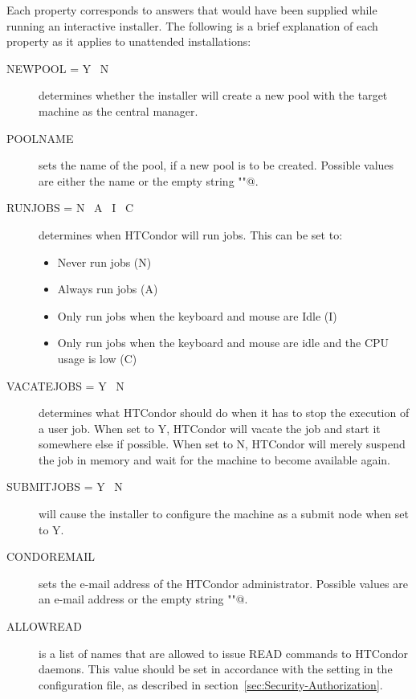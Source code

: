 Each property corresponds to answers that would have been
supplied while running an interactive installer.
The following is a brief explanation of each property
as it applies to unattended installations:

\begin{description}
\item [NEWPOOL = \lt{} Y \Bar{}\ N \gt{}]
determines whether the installer will create a new pool with the target
machine as the central manager.

\item [POOLNAME]
sets the name of the pool, if a new pool is to be created. Possible values
are either the name or the empty string \verb@""@.

\item [RUNJOBS = \lt{} N \Bar{}\ A \Bar{}\ I \Bar{}\ C \gt{}]
determines when HTCondor will run jobs. This can be set to:
\begin{itemize}
\item Never run jobs (N)
\item Always run jobs (A)
\item Only run jobs when the keyboard and mouse are Idle (I)
\item Only run jobs when the keyboard and mouse are idle and the CPU
usage is low (C)
\end{itemize}

\item [VACATEJOBS = \lt{} Y \Bar{}\ N \gt{}]
determines what HTCondor should do when it has to stop the execution of
a user job. When set to Y, HTCondor will vacate the job and start
it somewhere else if possible. When set to N, HTCondor will merely
suspend the job in memory and wait for the machine to become available
again. 

\item[SUBMITJOBS  = \lt{} Y \Bar{}\ N \gt{}]
will cause the installer to configure the machine as a submit
node when set to Y. 

\item[CONDOREMAIL]
sets the e-mail address of the HTCondor administrator. Possible values are
an e-mail address or the empty string \verb@""@.

\item[ALLOWREAD]
is a list of names that are allowed to issue READ commands to
HTCondor daemons. This value should be set in accordance with the
 setting in the configuration file, as described in
section~\ref{sec:Security-Authorization}.


\end{description}
